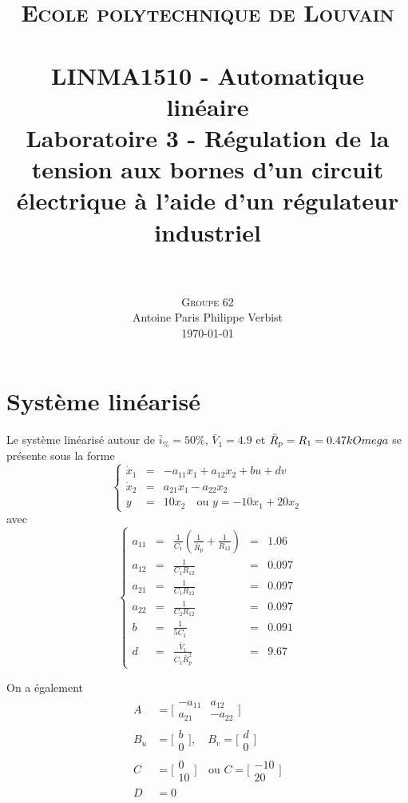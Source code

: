\documentclass[frenchb, paper=a4, fontsize=11pt]{scrartcl}
\title{
		\usefont{OT1}{bch}{b}{n}
		\normalfont \normalsize \textsc{Ecole polytechnique de Louvain} \\ [25pt]
		\horrule{0.5pt} \\[0.4cm]
		\large LINMA1510 - Automatique linéaire\\
		\huge Laboratoire 3 - Régulation de la tension aux bornes d'un circuit
		électrique à l'aide d'un régulateur industriel \\
		\horrule{1.5pt} \\[0.5cm]
}
\author{
		\normalfont
		\textsc{Groupe 62}\\
      	Antoine Paris\hspace{0.6cm} Philippe Verbist \\	
       	\normalsize
        \today
}
\date{}
\numberwithin{equation}{section}					%
\numberwithin{figure}{section}					%
\numberwithin{table}{section}						%
\begin{document}
\maketitle

\section{Système linéarisé}
Le système linéarisé autour de $\bar{i}_{\%}=50\%$, $\bar{V}_1 = 4.9$
et $\bar{R}_p = R_1 = 0.47k\/Omega$
se  présente sous la forme
\begin{equation}
\left\{ \begin{array}{lcl}
\dot{x}_1 &=& -a_{11}x_1 + a_{12} x_2 + bu + dv\\
\dot{x}_2 &=& a_{21} x_1 -a_{22} x_2\\
y&=& 10x_2 \quad \text{ou } y=-10x_1 + 20x_2
\end{array}\right.
\end{equation}
avec 
\begin{equation}
\left\{\begin{array}{lclcl}
a_{11} &=& \frac{1}{C_1}(\frac{1}{\bar{R}_p} + \frac{1}{R_{12}}) &=& 1.06\\
a_{12} &=& \frac{1}{C_1 R_{12}} &=& 0.097\\
a_{21} &=& \frac{1}{C_1 R_{12}} &=& 0.097\\
a_{22} &=& \frac{1}{C_2R_{12}} &=& 0.097\\
b &=& \frac{1}{5C_1} &=& 0.091\\
d &=& \frac{\bar{V}_1}{C_1\bar{R}_p^2} &=& 9.67
\end{array}\right.
\end{equation}

On a également
\begin{align}
A &= \bigg[\begin{array}{cc}
-a_{11} & a_{12}\\
a_{21} & -a_{22}
\end{array} \bigg]\\
B_u &= \bigg[\begin{array}{c}
b\\
0
\end{array} \bigg], \quad
B_v = \bigg[\begin{array}{c}
d\\
0
\end{array} \bigg]\\
C &= \bigg[\begin{array}{c}
0\\
10
\end{array} \bigg]
\quad \text{ou } C =\bigg[\begin{array}{c}
-10\\
20
\end{array} \bigg]\\
D&=0
\end{align}
\end{document}
